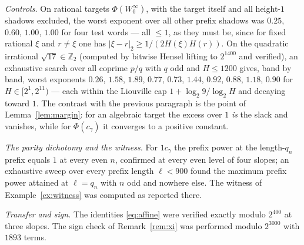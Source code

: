 \documentclass[11pt,reqno]{amsart}
\theoremstyle{plain}
\theoremstyle{definition}
\newcommand{\Z}{\mathbb{Z}}
\newcommand{\Zt}{\Z_2}
\newcommand{\PH}{\Phi}
\begin{document}
\emph{Controls.} On rational targets $\PH(W_0^{\infty})$, with the target itself and all height-$1$
shadows excluded, the worst exponent over all other prefix shadows was $0.25$, $0.60$, $1.00$,
$1.00$ for four test words --- all $\le1$, as they must be, since for fixed rational $\xi$ and
$r\ne\xi$ one has $|\xi-r|_2\ge1/(2H(\xi)H(r))$. On the quadratic irrational $\sqrt{17}\in\Zt$
(computed by bitwise Hensel lifting to $2^{1400}$ and verified), an exhaustive search over all
coprime $p/q$ with $q$ odd and $H\le1200$ gives, band by band, worst exponents
$0.26$, $1.58$, $1.89$, $0.77$, $0.73$, $1.44$, $0.92$, $0.88$, $1.18$, $0.90$ for
$H\in[2^{1},2^{11})$ --- each within the Liouville cap $1+\log_2 9/\log_2 H$ and decaying toward
$1$. The contrast with the previous paragraph is the point of Lemma~\ref{lem:margin}: for an
algebraic target the excess over $1$ \emph{is} the slack and vanishes, while for $\PH(c_\gamma)$ it
converges to a positive constant.

\emph{The parity dichotomy and the witness.} For $1c_\gamma$ the prefix power at the length-$q_n$
prefix equals $1$ at every even $n$, confirmed at every even level of four slopes; an exhaustive
sweep over every prefix length $\ell<900$ found the maximum prefix power attained at $\ell=q_n$ with
$n$ odd and nowhere else. The witness of Example~\ref{ex:witness} was computed as reported there.

\emph{Transfer and sign.} The identities \eqref{eq:affine} were verified exactly modulo $2^{400}$ at
three slopes. The sign check of Remark~\ref{rem:xi} was performed modulo $2^{3000}$ with $1893$
terms.



\end{document}
